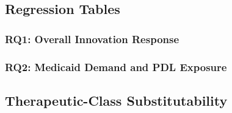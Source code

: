 \documentclass[12pt]{article}
\begin{document}
\subsection{Regression Tables}

\subsubsection{RQ1: Overall Innovation Response}

\begingroup\footnotesize

\label{tab:rq1_feols_exante}
\endgroup

\clearpage

\subsubsection{RQ2: Medicaid Demand and PDL Exposure}

\begingroup\footnotesize

\label{tab:rq2_feols_exante}
\endgroup

\clearpage


\subsection{Therapeutic-Class Substitutability}

\begingroup
\makeatletter
\renewenvironment{table}[1][H]{\@float{table}[H]}{\end@float}
\makeatother

\endgroup

\fi
\end{document}
